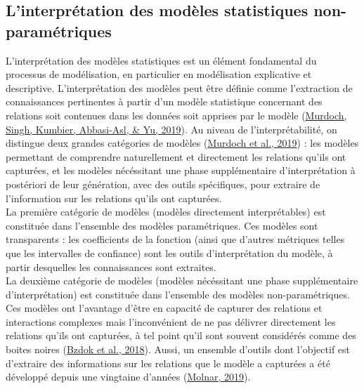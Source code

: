 \documentclass[12pt,twoside]{reedthesis}
\begin{document}
\hypertarget{model-interpretation}{%
\subsection{L'interprétation des modèles statistiques non-paramétriques}\label{model-interpretation}}

L'interprétation des modèles statistiques est un élément fondamental du processus de modélisation, en particulier en modélisation explicative et descriptive. L'interprétation des modèles peut être définie comme l'extraction de connaissances pertinentes à partir d'un modèle statistique concernant des relations soit contenues dans les données soit apprises par le modèle (\protect\hyperlink{ref-murdoch_definitions_2019}{Murdoch, Singh, Kumbier, Abbasi-Asl, \& Yu, 2019}). Au niveau de l'interprétabilité, on distingue deux grandes catégories de modèles (\protect\hyperlink{ref-murdoch_definitions_2019}{Murdoch et al., 2019}) : les modèles permettant de comprendre naturellement et directement les relations qu'ils ont capturées, et les modèles nécéssitant une phase supplémentaire d'interprétation à postériori de leur génération, avec des outils spécifiques, pour extraire de l'information sur les relations qu'ils ont capturées.\\

La première catégorie de modèles (modèles directement interprétables) est constituée dans l'ensemble des modèles paramétriques. Ces modèles sont transparents : les coefficients de la fonction (ainsi que d'autres métriques telles que les intervalles de confiance) sont les outils d'interprétation du modèle, à partir desquelles les connaissances sont extraites.\\

La deuxième catégorie de modèles (modèles nécéssitant une phase supplémentaire d'interprétation) est constituée dans l'ensemble des modèles non-paramétriques. Ces modèles ont l'avantage d'être en capacité de capturer des relations et interactions complexes mais l'inconvénient de ne pas délivrer directement les relations qu'ils ont capturées, à tel point qu'il sont souvent considérés comme des boites noires (\protect\hyperlink{ref-bzdok_statistics_2018}{Bzdok et al., 2018}). Aussi, un ensemble d'outils dont l'objectif est d'extraire des informations sur les relations que le modèle a capturées a été développé depuis une vingtaine d'années (\protect\hyperlink{ref-molnar_interpretable_2019}{Molnar, 2019}).\\
\end{document}
